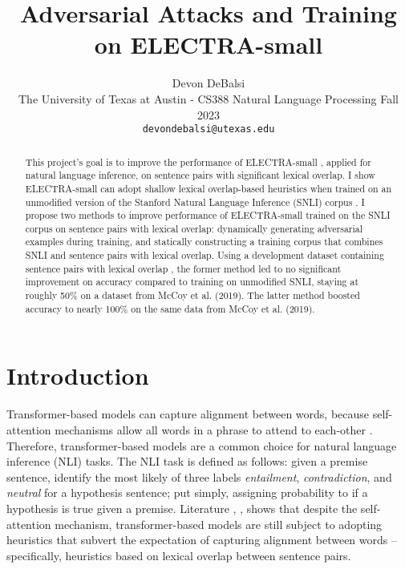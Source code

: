 \documentclass[11pt,a4paper]{article}
\title{Adversarial Attacks and Training on ELECTRA-small}
\author{Devon DeBalsi \\
  The University of Texas at Austin - CS388 Natural Language Processing Fall 2023 \\
  \texttt{devondebalsi@utexas.edu} }
\date{}
\begin{document}
\maketitle

\begin{abstract}
This project's goal is to improve the performance of ELECTRA-small \cite{DBLP:journals/corr/abs-2003-10555}, applied for natural language inference, on sentence pairs with significant lexical overlap. I show ELECTRA-small can adopt shallow lexical overlap-based heuristics when trained on an unmodified version of the Stanford Natural Language Inference (SNLI) corpus \cite{bowman-etal-2015-large}. I propose two methods to improve performance of ELECTRA-small trained on the SNLI corpus on sentence pairs with lexical overlap: dynamically generating adversarial examples during training, and statically constructing a training corpus that combines SNLI and sentence pairs with lexical overlap. Using a development dataset containing sentence pairs with lexical overlap \cite{DBLP:journals/corr/abs-1902-01007}, the former method led to no significant improvement on accuracy compared to training on unmodified SNLI, staying at roughly 50\% on a dataset from McCoy et al. (2019). The latter method boosted accuracy to nearly 100\% on the same data from McCoy et al. (2019).
\end{abstract}

\section{Introduction}
Transformer-based models can capture alignment between words, because self-attention mechanisms allow all words in a phrase to attend to each-other \cite{DBLP:journals/corr/VaswaniSPUJGKP17}. Therefore, transformer-based models are a common choice for natural language inference (NLI) \cite{maccartney-manning-2008-modeling} tasks. The NLI task is defined as follows: given a premise sentence, identify the most likely of three labels \textit{entailment}, \textit{contradiction}, and \textit{neutral} for a hypothesis sentence; put simply, assigning probability to if a hypothesis is true given a premise. Literature \cite{zhou-bansal-2020-towards}, \cite{mendelson-belinkov-2021-debiasing}, \cite{DBLP:journals/corr/abs-1902-01007} shows that despite the self-attention mechanism, transformer-based models are still subject to adopting heuristics that subvert the expectation of capturing alignment between words -- specifically, heuristics based on lexical overlap between sentence pairs.
\end{document}
